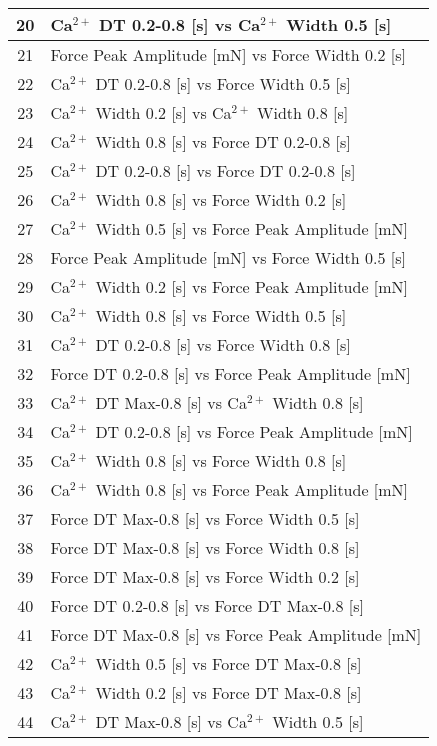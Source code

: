 \documentclass{article}
\begin{document}
\begin{longtable}{|c|l|}
\hline
20 & Ca$^{2+}$ DT 0.2-0.8 [s] vs Ca$^{2+}$ Width 0.5 [s] \\
\hline
21 & Force Peak Amplitude [mN] vs Force Width 0.2 [s] \\
\hline
22 & Ca$^{2+}$ DT 0.2-0.8 [s] vs Force Width 0.5 [s] \\
\hline
23 & Ca$^{2+}$ Width 0.2 [s] vs Ca$^{2+}$ Width 0.8 [s] \\
\hline
24 & Ca$^{2+}$ Width 0.8 [s] vs Force DT 0.2-0.8 [s] \\
\hline
25 & Ca$^{2+}$ DT 0.2-0.8 [s] vs Force DT 0.2-0.8 [s] \\
\hline
26 & Ca$^{2+}$ Width 0.8 [s] vs Force Width 0.2 [s] \\
\hline
27 & Ca$^{2+}$ Width 0.5 [s] vs Force Peak Amplitude [mN] \\
\hline
28 & Force Peak Amplitude [mN] vs Force Width 0.5 [s] \\
\hline
29 & Ca$^{2+}$ Width 0.2 [s] vs Force Peak Amplitude [mN] \\
\hline
30 & Ca$^{2+}$ Width 0.8 [s] vs Force Width 0.5 [s] \\
\hline
31 & Ca$^{2+}$ DT 0.2-0.8 [s] vs Force Width 0.8 [s] \\
\hline
32 & Force DT 0.2-0.8 [s] vs Force Peak Amplitude [mN] \\
\hline
33 & Ca$^{2+}$ DT Max-0.8 [s] vs Ca$^{2+}$ Width 0.8 [s] \\
\hline
34 & Ca$^{2+}$ DT 0.2-0.8 [s] vs Force Peak Amplitude [mN] \\
\hline
35 & Ca$^{2+}$ Width 0.8 [s] vs Force Width 0.8 [s] \\
\hline
36 & Ca$^{2+}$ Width 0.8 [s] vs Force Peak Amplitude [mN] \\
\hline
37 & Force DT Max-0.8 [s] vs Force Width 0.5 [s] \\
\hline
38 & Force DT Max-0.8 [s] vs Force Width 0.8 [s] \\
\hline
39 & Force DT Max-0.8 [s] vs Force Width 0.2 [s] \\
\hline
40 & Force DT 0.2-0.8 [s] vs Force DT Max-0.8 [s] \\
\hline
41 & Force DT Max-0.8 [s] vs Force Peak Amplitude [mN] \\
\hline
42 & Ca$^{2+}$ Width 0.5 [s] vs Force DT Max-0.8 [s] \\
\hline
43 & Ca$^{2+}$ Width 0.2 [s] vs Force DT Max-0.8 [s] \\
\hline
44 & Ca$^{2+}$ DT Max-0.8 [s] vs Ca$^{2+}$ Width 0.5 [s] \\

\end{longtable}
\end{document}
